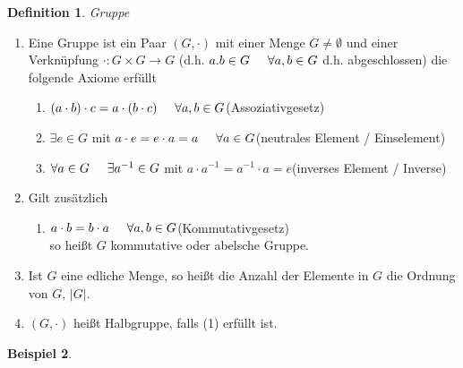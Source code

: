 \documentclass[a4paper,11pt]{article}
\newtheorem{definition}{Definition}[section]
\newtheorem{bsp}[definition]{Beispiel}
\begin{document}
\begin{definition}
Gruppe
\end{definition}
\begin{enumerate}[label=\alph*)]
\item Eine Gruppe ist ein Paar $(G,\cdot)$ mit einer Menge $G\neq\emptyset$ und einer Verknüpfung $\cdot\colon G\times G\rightarrow G$ (d.h. $a.b\in G\hspace{5mm}\forall a,b\in G$ d.h. abgeschlossen) die folgende Axiome erfüllt
\begin{enumerate}[label=(\arabic*)]
\item $(a\cdot b)\cdot c = a\cdot(b\cdot c)\hspace{5mm}\forall a,b\in G$\hspace{5mm}(Assoziativgesetz)
\item $\exists e\in G$ mit $a\cdot e = e\cdot a = a\hspace{5mm}\forall a\in G$\hspace{5mm}(neutrales Element / Einselement)
\item $\forall a\in G\hspace{5mm}\exists a^{-1}\in G$ mit $a\cdot a^{-1}=a^{-1}\cdot a = e$\hspace{5mm}(inverses Element / Inverse)
\end{enumerate}
\item Gilt zusätzlich
\begin{enumerate}[label=(\arabic*),start=4]
\item $a\cdot b = b\cdot a\hspace{5mm}\forall a,b\in G$\hspace{5mm}(Kommutativgesetz) \\
so heißt $G$ kommutative oder abelsche Gruppe.
\end{enumerate}
\item Ist $G$ eine edliche Menge, so heißt die Anzahl der Elemente in $G$ die Ordnung von $G$, $\vert G\vert$.
\item $(G,\cdot)$ heißt Halbgruppe, falls (1) erfüllt ist.
\end{enumerate}
\newpage
\begin{bsp}
\end{bsp}
\end{document}
